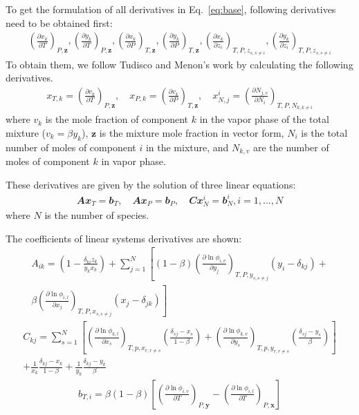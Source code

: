 To get the formulation of all derivatives in Eq.~\ref{eq:base}, following derivatives need to be obtained first:
\begin{align}
	\left(\frac{\partial x_k}{\partial T}\right)_{P,\mathbf{z}},\left(\frac{\partial y_k}{\partial T}\right)_{P,\mathbf{z}},\left(\frac{\partial x_k}{\partial P}\right)_{T,\mathbf{z}},\left(\frac{\partial y_k}{\partial P}\right)_{T,\mathbf{z}},\left(\frac{\partial x_k}{\partial z_i}\right)_{T,P,z_{s,s\neq i}},\left(\frac{\partial y_k}{\partial z_i}\right)_{T,P,z_{s,s\neq i}} \label{eq:app:6derivatives}
\end{align}
To obtain them, we follow Tudisco and Menon's work \cite{tudisco2020analytical} by calculating the following derivatives.
\begin{align}
	x_{T,k}=\left(\frac{\partial v_k}{\partial T}\right)_{P,\mathbf{z}},\quad
	x_{P,k}=\left(\frac{\partial v_k}{\partial P}\right)_{T,\mathbf{z}},\quad
	x_{N,j}^i=\left(\frac{\partial N_{j,v}}{\partial N_i}\right)_{T,P,N_{k,k\neq i}}
\end{align}
where $v_k$ is the mole fraction of component $k$ in the vapor phase of the total mixture ($v_k = \beta y_k$), $\mathbf{z}$ is the mixture mole fraction in vector form,
$N_i$ is the total number of moles of component $i$ in the mixture, and $N_{k,v}$ are the number of moles of component $k$ in vapor phase.

These derivatives are given by the solution of three linear equations:
\begin{align}
	\mathbfit{A} \mathbfit{x}_T = \mathbfit{b}_T, \quad
	\mathbfit{A} \mathbfit{x}_P = \mathbfit{b}_P, \quad
	\mathbfit{C}\mathbfit{x}_N^i=\mathbfit{b}_N^i, i = 1,...,N
\end{align}
where $N$ is the number of species.

The coefficients of linear systems derivatives are shown:
\begin{align}
	\mathit{A}_{ik} = \left( 1- \frac{\delta_{ki}z_k}{y_k x_k}\right) +\sum_{j=1}^N\left[(1-\beta)\left(\frac{\partial \ln\phi_{i,v}}{\partial y_j}\right)_{T,P,y_{s,s\neq j}}\left(y_i-\delta_{kj}\right)+\right. \nonumber \\
	\left.\beta\left(\frac{\partial \ln\phi_{i,l}}{\partial x_j}\right)_{T,P,x_{s,s\neq j}}\left(x_j-\delta_{jk}\right)\right]
\end{align}
\begin{align}
	C_{kj}=\sum_{s=1}^N\left[\left(\frac{\partial \ln\phi_{k,l}}{\partial x_s}\right)_{T,p,x_{r,r\neq s}}\left(\frac{\delta_{sj}-x_s}{1-\beta}\right)+\left(\frac{\partial \ln\phi_{k,v}}{\partial y_s}\right)_{T,p,y_{r,r\neq s}}\left(\frac{\delta_{sj}-y_s}{\beta}\right)\right] \nonumber \\
	+\frac{1}{x_k}\frac{\delta_{kj}-x_k}{1-\beta}+\frac{1}{y_k}\frac{\delta_{kj}-y_k}{\beta}
\end{align}
\begin{align}
	b_{T,i}=\beta(1-\beta)\left[\left(\frac{\partial \ln\phi_{i,v}}{\partial T}\right)_{P,\mathbf{y}}-\left(\frac{\partial \ln\phi_{i,l}}{\partial T}\right)_{P,\mathbf{x}}\right]
\end{align}

